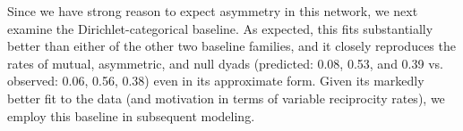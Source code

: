 \documentclass[11pt]{article}
\begin{document}
\begin{sidewaystable}
\begin{center}
\caption{\label{t_ucds} Fitted models for the Urban Communes data set.}
\end{center}
\end{sidewaystable}

Since we have strong reason to expect asymmetry in this network, we next examine the Dirichlet-categorical baseline.  As expected, this fits substantially better than either of the other two baseline families, and it closely reproduces the rates of mutual, asymmetric, and null dyads (predicted: 0.08, 0.53, and 0.39 vs. observed: 0.06, 0.56, 0.38) even in its approximate form.  Given its markedly better fit to the data (and motivation in terms of variable reciprocity rates), we employ this baseline in subsequent modeling.
\end{document}
